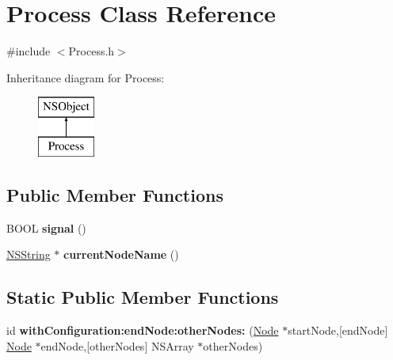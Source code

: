 \hypertarget{interface_process}{
\section{\-Process \-Class \-Reference}
\label{interface_process}
}


{\ttfamily \#include $<$\-Process.\-h$>$}

\-Inheritance diagram for \-Process\-:\begin{figure}[H]
\begin{center}
\leavevmode
\includegraphics[height=2.000000cm]{interface_process}
\end{center}
\end{figure}
\subsection*{\-Public \-Member \-Functions}
\begin{DoxyCompactItemize}
\item 
\hypertarget{interface_process_a796babc99f80a32ff985bfcc5c6ad899}{
\-B\-O\-O\-L {\bfseries signal} ()}
\label{interface_process_a796babc99f80a32ff985bfcc5c6ad899}

\item 
\hypertarget{interface_process_a2f155879cd902ed79d682daa867425db}{
\hyperlink{class_n_s_string}{\-N\-S\-String} $\ast$ {\bfseries current\-Node\-Name} ()}
\label{interface_process_a2f155879cd902ed79d682daa867425db}

\end{DoxyCompactItemize}
\subsection*{\-Static \-Public \-Member \-Functions}
\begin{DoxyCompactItemize}
\item 
\hypertarget{interface_process_a7a3fb567a502a7b3ea44f867bc213450}{
id {\bfseries with\-Configuration\-:end\-Node\-:other\-Nodes\-:} (\hyperlink{interface_node}{\-Node} $\ast$start\-Node,\mbox{[}end\-Node\mbox{]} \hyperlink{interface_node}{\-Node} $\ast$end\-Node,\mbox{[}other\-Nodes\mbox{]} \-N\-S\-Array $\ast$other\-Nodes)}
\label{interface_process_a7a3fb567a502a7b3ea44f867bc213450}

\end{DoxyCompactItemize}
